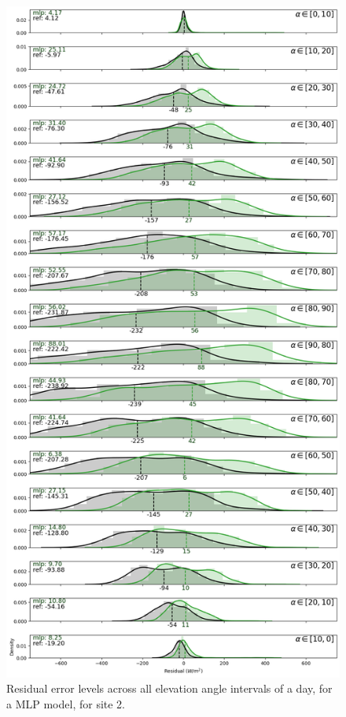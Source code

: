 \begin{figure}[htb!]
    \centering
    \includegraphics[width=\columnwidth]{figures/first_study/residual_errors_mlp_site2_rmse.png}
\caption{Residual error levels across all elevation angle intervals of a day, for a MLP model, for site 2.}
\end{figure}


